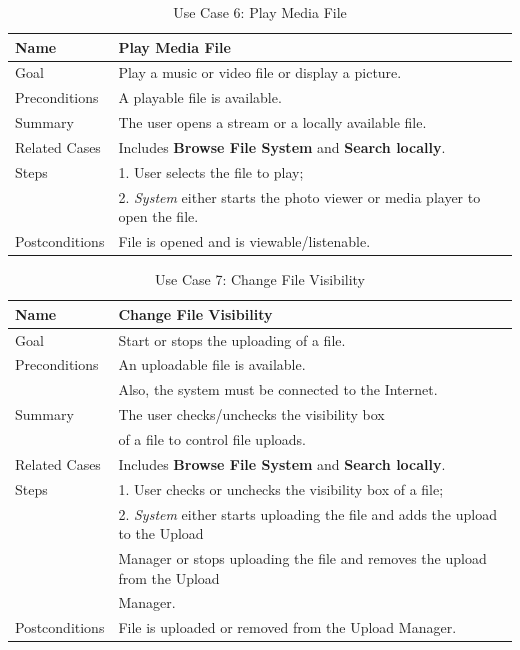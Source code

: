 \begin{table}[h!]
\centering
\begin{tabular}{|l|l|}
\hline
Name & Play Media File\\ \hline
Goal & Play a music or video file or display a picture.\\ \hline
Preconditions & A playable file is available. \\ \hline
Summary & The user opens a stream or a locally available file.\\ \hline
Related Cases & Includes \textbf{Browse File System} and \textbf{Search locally}. \\ \hline
Steps &  1. User selects the file to play; \\
      &  2. \textit{System} either starts the photo viewer or media player to open the file. 
        \\ \hline
Postconditions & File is opened and is viewable/listenable.
\\ \hline
\end{tabular}
\caption{Use Case 6: Play Media File}
\label{tab:UC6}
\end{table}

\begin{table}[h!]
\centering
\begin{tabular}{|l|l|}
\hline
Name & Change File Visibility\\ \hline
Goal & Start or stops the uploading of a file.\\ \hline
Preconditions & An uploadable file is available. \\
& Also, the system must be connected to the Internet. \\ \hline
Summary & The user checks/unchecks the visibility box \\
& of a file to control file uploads.\\ \hline
Related Cases & Includes \textbf{Browse File System} and \textbf{Search locally}. \\ \hline
Steps &  1. User checks or unchecks the visibility box of a file; \\
      &  2. \textit{System} either starts uploading the file and adds the upload to the Upload \\
      &     Manager or  stops uploading the file and removes the upload from the Upload \\
      &     Manager.
        \\ \hline
Postconditions & File is uploaded or removed from the Upload Manager.
\\ \hline
\end{tabular}
\caption{Use Case 7: Change File Visibility}
\label{tab:UC7}
\end{table}

